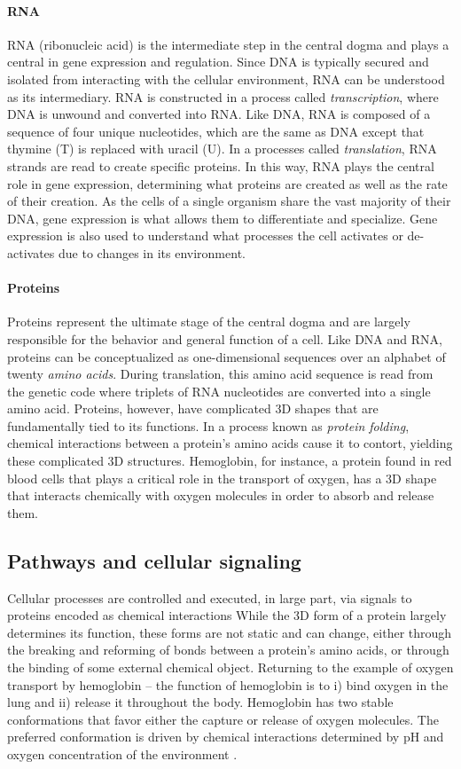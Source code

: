 \paragraph{RNA} RNA (ribonucleic acid) is the intermediate step in the central dogma and plays a central in gene expression and regulation.
Since DNA is typically secured and isolated from interacting with the cellular environment, RNA can be understood as its intermediary.
RNA is constructed in a process called \emph{transcription}, where DNA is unwound and converted into RNA.
Like DNA, RNA is composed of a sequence of four unique nucleotides, which are the same as DNA except that thymine (T) is replaced with uracil (U).
In a processes called \emph{translation}, RNA strands are read to create specific proteins.
In this way, RNA plays the central role in gene expression, determining what proteins are created as well as the rate of their creation.
As the cells of a single organism share the vast majority of their DNA, 
gene expression is what allows them to differentiate and specialize.
Gene expression is also used to understand what processes the cell activates or de-activates due to changes in its environment.

\paragraph{Proteins} Proteins represent the ultimate stage of the central dogma and are largely responsible for the behavior and general function of a cell.
Like DNA and RNA, proteins can be conceptualized as one-dimensional sequences over an alphabet of twenty \emph{amino acids}.
During translation, this amino acid sequence is read from the genetic code where triplets of RNA nucleotides are converted into a single amino acid.
Proteins, however, have complicated 3D shapes that are fundamentally tied to its functions.
In a process known as \emph{protein folding}, chemical interactions between a protein's amino acids cause it to contort, yielding these complicated 3D structures.
Hemoglobin, for instance, a protein found in red blood cells that plays a critical role in the transport of oxygen, has a 3D shape that interacts chemically with oxygen molecules in order to absorb and release them.

\subsection{Pathways and cellular signaling}
Cellular processes are controlled and executed, in large part, via signals to proteins encoded as chemical interactions
While the 3D form of a protein largely determines its function,
these forms are not static and can change,
either through the breaking and reforming of bonds between a protein's amino acids,
or through the binding of some external chemical object.
Returning to the example of oxygen transport by hemoglobin -- the function of hemoglobin is to i) bind oxygen in the lung and ii) release it throughout the body.
Hemoglobin has two stable conformations that favor either the capture or release of oxygen molecules.
The preferred conformation is driven by chemical interactions determined by pH and oxygen concentration of the environment \cite{riggs1971}.

